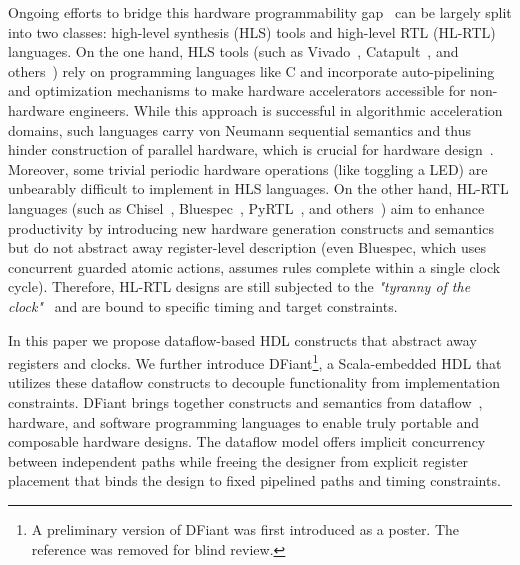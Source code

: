 Ongoing efforts to bridge this hardware programmability gap~\cite{Kapre2016, Nane2016, Windh2015} can be largely split into two classes: high-level synthesis (HLS) tools and high-level RTL (HL-RTL) languages.
On the one hand, HLS tools (such as Vivado~\cite{Vivado2012}, Catapult~\cite{graphics2008catapult}, and others~\cite{Kavvadias2013, synphony2015}) rely on programming languages like C and incorporate auto-pipelining and optimization mechanisms to make hardware accelerators accessible for non-hardware engineers. While this approach is successful in algorithmic acceleration domains, such languages carry von Neumann sequential semantics and thus hinder construction of parallel hardware, which is crucial for hardware design~\cite{Zhao2017}. Moreover, some trivial periodic hardware operations (like toggling a LED) are unbearably difficult to implement in HLS languages.
On the other hand, HL-RTL languages (such as Chisel~\cite{Bachrach2012}, Bluespec~\cite{nikhil2004bluespec}, PyRTL~\cite{Clow2017}, and others~\cite{Charles2016, Liu2017, jiang2018mamba, decaluwe2004myhdl, CxLang2014, Lockhart2014}) aim to enhance productivity by introducing new hardware generation constructs and semantics but do not abstract away register-level description (even Bluespec, which uses concurrent guarded atomic actions, assumes rules complete within a single clock cycle). Therefore, HL-RTL designs are still subjected to the \emph{"tyranny of the clock"}~\cite{Sutherland2012} and are bound to specific timing and target constraints.

In this paper we propose dataflow-based HDL constructs that abstract away registers and clocks. We further introduce DFiant\footnote{A preliminary version of DFiant was first introduced as a poster. The reference was removed for blind review.}, a Scala-embedded HDL that utilizes these dataflow constructs to decouple functionality from implementation constraints. DFiant brings together constructs and semantics from dataflow~\cite{le1986signal, Thuau1991, gurd1985manchester, arvind1992id}, hardware, and software programming languages to enable truly portable and composable hardware designs. The dataflow model offers implicit concurrency between independent paths while freeing the designer from explicit register placement that binds the design to fixed pipelined paths and timing constraints.

